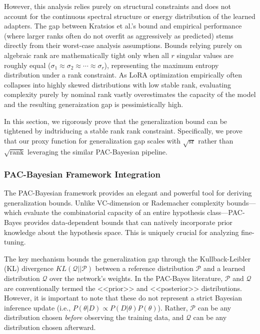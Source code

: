 \documentclass[a4paper,14pt]{extarticle}
\DeclareMathOperator{\rank}{rank}
\DeclareMathOperator{\sr}{sr}
\begin{document}
    However, this analysis relies purely on structural constraints and does not account for the continuous spectral structure or energy distribution of the learned adapters. The gap between Kratsios et al.'s bound and empirical performance (where larger ranks often do not overfit as aggressively as predicted) stems directly from their worst-case analysis assumptions. Bounds relying purely on algebraic rank are mathematically tight only when all $r$ singular values are roughly equal ($\sigma_1 \approx \sigma_2 \approx \cdots \approx \sigma_r$), representing the maximum entropy distribution under a rank constraint. As LoRA optimization empirically often collapses into highly skewed distributions with low stable rank, evaluating complexity purely by nominal rank vastly overestimates the capacity of the model and the resulting generaization gap is pessimistically high.
    
    In this section, we rigorously prove that the generalization bound can be tightened by indtriducing a stable rank rank constraint. Specifically, we prove that our proxy function for generalization gap scales with $\sqrt{\sr}$ rather than $\sqrt{\rank}$ leveraging the similar PAC-Bayesian pipeline.



    \subsubsection{PAC-Bayesian Framework Integration}

    The PAC-Bayesian framework \cite{mcallester1999pac, mcallester2003simplified, shawe1997pac} provides an elegant and powerful tool for deriving generalization bounds. Unlike VC-dimension or Rademacher complexity bounds---which evaluate the combinatorial capacity of an entire hypothesis class---PAC-Bayes provides data-dependent bounds that can natively incorporate prior knowledge about the hypothesis space. This is uniquely crucial for analyzing fine-tuning.

    The key mechanism bounds the generalization gap through the Kullback-Leibler (KL) divergence $KL(\mathcal{Q} || \mathcal{P})$ between a reference distribution $\mathcal{P}$ and a learned distribution $\mathcal{Q}$ over the network's weights. In the PAC-Bayes literature, $\mathcal{P}$ and $\mathcal{Q}$ are conventionally termed the <<prior>> and <<posterior>> distributions. However, it is important to note that these do not represent a strict Bayesian inference update (i.e., $P(\theta|D) \propto P(D|\theta)P(\theta)$). Rather, $\mathcal{P}$ can be any distribution chosen \textit{before} observing the training data, and $\mathcal{Q}$ can be any distribution chosen afterward. 
    
\end{document}
